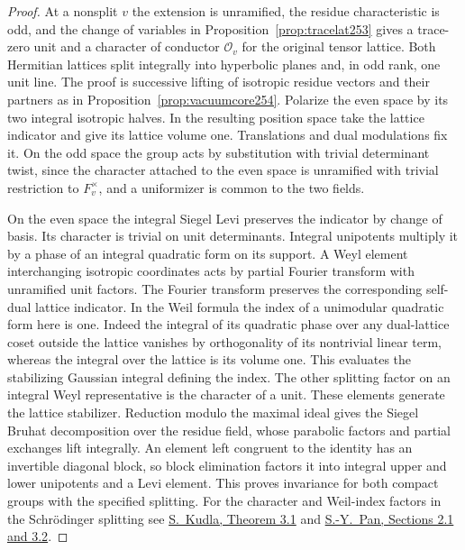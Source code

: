 \documentclass[a4paper,11pt]{article}
\theoremstyle{definition}
\theoremstyle{remark}
\numberwithin{equation}{section}
\begin{document}
\begin{proof}
At a nonsplit \(v\) the extension is unramified, the residue
characteristic is odd, and the change of variables in
Proposition~\ref{prop:tracelat253} gives a trace-zero unit and
a character of conductor \(\mathcal O_v\) for the original tensor
lattice. Both Hermitian lattices split integrally into hyperbolic
planes and, in odd rank, one unit line. The proof is successive
lifting of isotropic residue vectors and their partners as in
Proposition~\ref{prop:vacuumcore254}. Polarize the even space
by its two integral isotropic halves. In the resulting position
space take the lattice indicator and give its lattice volume one.
Translations and dual modulations fix it. On the odd space the
group acts by substitution with trivial determinant twist, since
the character attached to the even space is unramified with
trivial restriction to \(F_v^\times\), and a uniformizer is
common to the two fields.

On the even space the integral Siegel Levi preserves the indicator
by change of basis. Its character is trivial on unit determinants.
Integral unipotents multiply it by a phase of an integral
quadratic form on its support. A Weyl element interchanging
isotropic coordinates acts by partial Fourier transform with
unramified unit factors. The Fourier transform preserves the
corresponding self-dual lattice indicator. In the Weil formula
the index of a unimodular quadratic form here is one. Indeed
the integral of its quadratic phase over any dual-lattice coset
outside the lattice vanishes by orthogonality of its nontrivial
linear term, whereas the integral over the lattice is its volume
one. This evaluates the stabilizing Gaussian integral defining
the index. The other splitting factor on an integral Weyl
representative is the character of a unit. These elements
generate the lattice stabilizer. Reduction modulo the maximal
ideal gives the Siegel Bruhat decomposition over the residue field,
whose parabolic factors and partial exchanges lift integrally.
An element left congruent to the identity has an invertible
diagonal block, so block elimination factors it into integral
upper and lower unipotents and a Levi element. This proves
invariance for both compact groups with the specified splitting.
For the character and Weil-index factors in the Schr\"odinger
splitting see \href{https://doi.org/10.1007/BF02773003}
{S.~Kudla, Theorem 3.1} and
\href{https://msp.org/pjm/2001/199-1/pjm-v199-n1-p10-s.pdf}
{S.-Y.~Pan, Sections 2.1 and 3.2}.


\end{proof}
\end{document}
